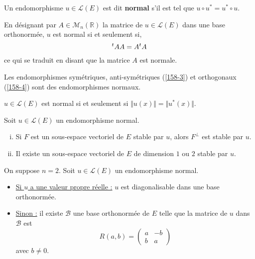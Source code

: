 	
	\begin{definition}
		Un endomorphisme $u \in \mathcal{L}(E)$ est dit \textbf{normal} s'il est tel que $u \circ u^* = u^* \circ u$.
	\end{definition}
	
	\begin{remark}
		En désignant par $A \in \mathcal{M}_n(\mathbb{R})$ la matrice de $u \in \mathcal{L}(E)$ dans une base orthonormée, $u$ est normal si et seulement si,
		\[ \mathstrut ^t A A = A \mathstrut ^t A \]
		ce qui se traduit en disant que la matrice $A$ est normale.
	\end{remark}
	
	\begin{example}
		Les endomorphismes symétriques, anti-symétriques (\cref{158-3}) et orthogonaux (\cref{158-4}) sont des endomorphismes normaux.
	\end{example}
	
	
	\begin{proposition}
		$u \in \mathcal{L}(E)$ est normal si et seulement si $\Vert u (x) \Vert = \Vert u^* (x) \Vert$.
	\end{proposition}
	
	
	\begin{proposition}
		Soit $u \in \mathcal{L}(E)$ un endomorphisme normal.
		\begin{enumerate}[(i)]
			\item Si $F$ est un sous-espace vectoriel de $E$ stable par $u$, alors $F^\perp$ est stable par $u$.
			\item Il existe un sous-espace vectoriel de $E$ de dimension $1$ ou $2$ stable par $u$.
		\end{enumerate}
	\end{proposition}
	
	\begin{proposition}[Réduction dans le cas $n = 2$]
		\label{158-2}
		On suppose $n = 2$. Soit $u \in \mathcal{L}(E)$ un endomorphisme normal.
		\begin{itemize}
			\item \underline{Si $u$ a une valeur propre réelle :} $u$ est diagonalisable dans une base orthonormée.
			\item \underline{Sinon :} il existe $\mathcal{B}$ une base orthonormée de $E$ telle que la matrice de $u$ dans $\mathcal{B}$ est
			\[ R(a,b) = \begin{pmatrix} a & -b \\ b & a \end{pmatrix} \]
			avec $b \neq 0$.
		\end{itemize}
	\end{proposition}
	
